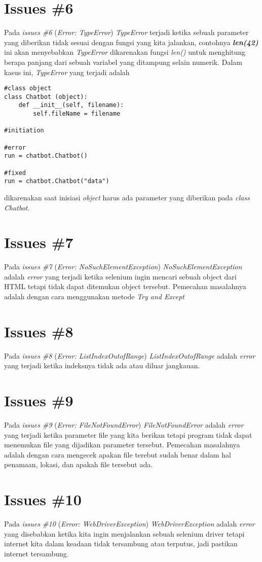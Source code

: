 \section{Issues \#6}
Pada \textit{issues \#6} (\textit{Error: TypeError}) \textit{TypeError} terjadi ketika sebuah parameter yang diberikan tidak sesuai dengan fungsi yang kita jalankan, contohnya \textbf{\textit{len(42)}} ini akan menyebabkan \textit{TypeError} dikarenakan fungsi \textit{len()} untuk menghitung berapa panjang dari sebuah variabel yang ditampung selain numerik. Dalam kasus ini, \textit{TypeError} yang terjadi adalah
\begin{verbatim}
#class object
class Chatbot (object):
    def __init__(self, filename):
        self.fileName = filename
		
#initiation

#error
run = chatbot.Chatbot()

#fixed
run = chatbot.Chatbot("data")
\end{verbatim}
dikarenakan saat inisiasi \textit{object} harus ada parameter yang diberikan pada \textit{class Chatbot}.

\section{Issues \#7}
Pada \textit{issues \#7} (\textit{Error: NoSuchElementException}) \textit{NoSuchElementException} adalah \textit{error} yang terjadi ketika selenium ingin mencari sebuah object dari HTML tetapi tidak dapat ditemukan object tersebut. Pemecahan masalahnya adalah dengan cara menggunakan metode \textit{Try and Except}

\section{Issues \#8}
Pada \textit{issues \#8} (\textit{Error: ListIndexOutofRange}) \textit{ListIndexOutofRange} adalah \textit{error} yang terjadi ketika indeksnya tidak ada atau diluar jangkauan.

\section{Issues \#9}
Pada \textit{issues \#9} (\textit{Error: FileNotFoundError}) \textit{FileNotFoundError} adalah \textit{error} yang terjadi ketika parameter file yang kita berikan tetapi program tidak dapat menemukan file yang dijadikan parameter tersebut. Pemecahan masalahnya adalah dengan cara mengecek apakan file terebut sudah benar dalam hal penamaan, lokasi, dan apakah file tersebut ada.

\section{Issues \#10}
Pada \textit{issues \#10} (\textit{Error: WebDriverException}) \textit{WebDriverException} adalah \textit{error} yang disebabkan ketika kita ingin menjalankan sebuah selenium driver tetapi internet kita dalam keadaan tidak tersambung atau terputus, jadi pastikan internet tersambung.